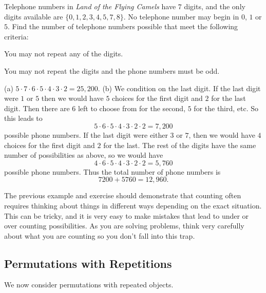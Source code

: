 \begin{exer}
Telephone numbers in {\em Land of the Flying Camels} have $7$
digits, and the only digits available are $\{0,1, 2,3,4,5, 7, 8\}$.
No telephone number may begin in $0$, $1$ or $5$. Find the number of
telephone numbers possible that meet the following criteria:
\begin{lenum}
 \item 
 You may not repeat any of the digits.
 
\answerlinetwo
\item 
You may not repeat the digits and the phone numbers must be odd.

\answerlinetwo
\end{lenum}
\begin{answer}
(a) $5\cdot 7\cdot 6 \cdot 5 \cdot 4 \cdot 3 \cdot 2 = 25,200$. 
(b) We condition on the last digit. 
If the last digit were $1$ or $5$ then we would have $5$
choices for the first digit and $2$ for the last digit.
Then there are $6$ left to choose from for the second, $5$ for the third, etc.
So this leads to  
$$5\cdot 6 \cdot 5\cdot 4 \cdot 3\cdot 2 \cdot 2 = 7,200$$ 
possible phone numbers. 
If the last digit were either $3$ or $7$, then 
we would have $4$ choices for the first digit and $2$ for the last.
The rest of the digits have the same number of possibilities as above, so we would
have
$$4\cdot 6\cdot 5 \cdot 4 \cdot 3\cdot 2 \cdot 2  = 5,760   $$
possible phone numbers. Thus the total number of phone numbers is 
$$7200 + 5760 = 12,960.$$
\end{answer}
\end{exer}

The previous example and exercise should demonstrate that counting often requires thinking about
things in different ways depending on the exact situation.  This can be tricky, and it
is very easy to make mistakes that lead to under or over counting possibilities.
As you are solving problems, think very carefully about what you are counting so 
you don't fall into this trap.

\subsection{Permutations with Repetitions}
We now consider permutations with repeated objects.

